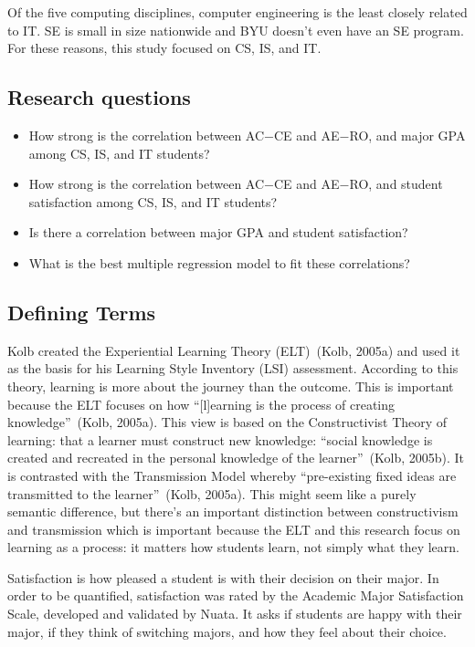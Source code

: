 Of the five computing disciplines, computer engineering is the least closely related to IT. SE is small in size nationwide and BYU doesn't even have an SE program. For these reasons, this study focused on CS, IS, and IT.

\subsection{Research questions}
\begin{itemize}
  \item How strong is the correlation between AC$-$CE and AE$-$RO, and major GPA among CS, IS, and IT students?
  \item How strong is the correlation between AC$-$CE and AE$-$RO, and student satisfaction among CS, IS, and IT students?
  \item Is there a correlation between major GPA and student satisfaction?
  \item What is the best multiple regression model to fit these correlations?
\end{itemize}

\subsection{Defining Terms}
Kolb created the Experiential Learning Theory (ELT)~(Kolb, 2005a) and used it as the basis for his Learning Style Inventory (LSI) assessment. According to this theory, learning is more about the journey than the outcome. This is important because the ELT focuses on how ``[l]earning is the process of creating knowledge''~(Kolb, 2005a). This view is based on the Constructivist Theory of learning: that a learner must construct new knowledge: ``social knowledge is created and recreated in the personal knowledge of the learner''~(Kolb, 2005b). It is contrasted with the Transmission Model whereby ``pre-existing fixed ideas are transmitted to the learner''~(Kolb, 2005a). This might seem like a purely semantic difference, but there's an important distinction between constructivism and transmission which is important because the ELT and this research focus on learning as a process: it matters how students learn, not simply what they learn.

Satisfaction is how pleased a student is with their decision on their major. In order to be quantified, satisfaction was rated by the Academic Major Satisfaction Scale, developed and validated by Nuata. It asks if students are happy with their major, if they think of switching majors, and how they feel about their choice.

